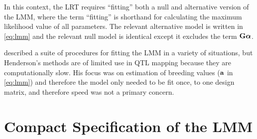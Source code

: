 In this context, the LRT requires ``fitting'' both a null and alternative version of the LMM, where the term ``fitting'' is shorthand for calculating the maximum likelihood value of all parameters.
The relevant alternative model is written in \cref{eq:lmm} and the relevant null model is identical except it excludes the term $\mathbf{G}\boldsymbol{\alpha}$.

\citet{Henderson1984} described a suite of procedures for fitting the LMM in a variety of situations, but Henderson's methods are of limited use in QTL mapping because they are computationally slow.
His focus was on estimation of breeding values ($\mathbf{a}$ in \cref{eq:lmm}) and therefore the model only needed to be fit once, to one design matrix, and therefore speed was not a primary concern.










\section{Compact Specification of the LMM}

